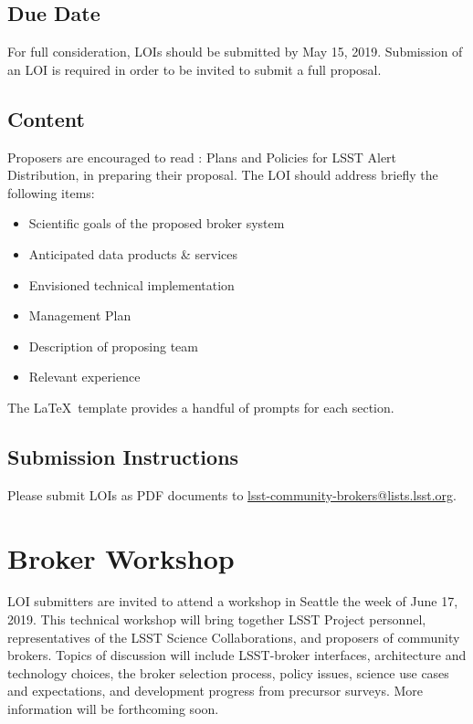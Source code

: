 \documentclass[DM,toc,lsstdraft]{lsstdoc}
\begin{document}
\subsection{Due Date}

For full consideration, LOIs should be submitted by May 15, 2019.
Submission of an LOI is required in order to be invited to submit a full proposal.

\subsection{Content}


Proposers are encouraged to read : Plans and Policies for LSST Alert Distribution, in preparing their proposal. 
The LOI should address briefly the following items:

\begin{itemize}
	\item Scientific goals of the proposed broker system
	\item Anticipated data products \& services
	\item Envisioned technical implementation
	\item Management Plan
	\item Description of proposing team
	\item Relevant experience 
\end{itemize}

The \LaTeX\ template provides a handful of prompts for each section.

\subsection{Submission Instructions}

Please submit LOIs as PDF documents to \url{lsst-community-brokers@lists.lsst.org}.

\section{Broker Workshop}


LOI submitters are invited to attend a workshop in Seattle the week of June 17, 2019.
This technical workshop will bring together LSST Project personnel, representatives of the LSST Science Collaborations, and proposers of community brokers.  
Topics of discussion will include LSST-broker interfaces, architecture and technology choices, the broker selection process, policy issues, science use cases and expectations, and development progress from precursor surveys.
More information will be forthcoming soon.
\end{document}
